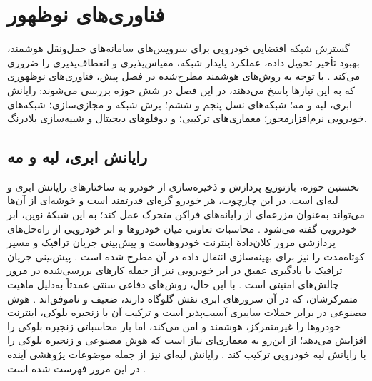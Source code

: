 \section{فناوری‌های نوظهور}
گسترش شبکه اقتضایی خودرویی برای سرویس‌های سامانه‌های حمل‌ونقل هوشمند، بهبود تأخیر تحویل داده، عملکرد پایدار شبکه، مقیاس‌پذیری و انعطاف‌پذیری را ضروری می‌کند \cite{hozouriOverviewVANETVehicular2023}. با توجه به روش‌های هوشمند مطرح‌شده در فصل پیش، فناوری‌های نوظهوری که به این نیازها پاسخ می‌دهند، در این فصل در شش حوزه بررسی می‌شوند: رایانش ابری، لبه و مه؛ شبکه‌های نسل پنجم و ششم؛ برش شبکه و مجازی‌سازی؛ شبکه‌های خودرویی نرم‌افزارمحور؛ معماری‌های ترکیبی؛ و دوقلوهای دیجیتال و شبیه‌سازی بلادرنگ.

\subsection{رایانش ابری، لبه و مه}
نخستین حوزه، بازتوزیع پردازش و ذخیره‌سازی از خودرو به ساختارهای رایانش ابری و لبه‌ای است. در این چارچوب، هر خودرو گره‌ای قدرتمند است و خوشه‌ای از آن‌ها می‌تواند به‌عنوان مزرعه‌ای از رایانه‌های فرا‌کن متحرک عمل کند؛ به این شبکهٔ نوین، ابر خودرویی گفته می‌شود \cite{hozouriOverviewVANETVehicular2023}. محاسبات تعاونی میان خودروها و ابر خودرویی از راه‌حل‌های پردازشی مرور کلان‌دادهٔ اینترنت خودروهاست و پیش‌بینی جریان ترافیک و مسیر کوتاه‌مدت را نیز برای بهینه‌سازی انتقال داده در آن مطرح شده است \cite{xuInternetVehiclesBig2018}. پیش‌بینی جریان ترافیک با یادگیری عمیق در ابر خودرویی نیز از جمله کارهای بررسی‌شده در مرور چالش‌های امنیتی است \cite{farsimadanReviewSecurityChallenges2025}. با این حال، روش‌های دفاعی سنتی عمدتاً به‌دلیل ماهیت متمرکزشان، که در آن سرورهای ابری نقش گلوگاه دارند، ضعیف و ناموفق‌اند \cite{farsimadanReviewSecurityChallenges2025}. هوش مصنوعی در برابر حملات سایبری آسیب‌پذیر است و ترکیب آن با زنجیره بلوکی، اینترنت خودروها را غیرمتمرکز، هوشمند و امن می‌کند، اما بار محاسباتی زنجیره بلوکی را افزایش می‌دهد؛ از این‌رو به معماری‌ای نیاز است که هوش مصنوعی و زنجیره بلوکی را با رایانش لبه خودرویی ترکیب کند \cite{hozouriOverviewVANETVehicular2023}. رایانش لبه‌ای  نیز از جمله موضوعات پژوهشی آینده در این مرور فهرست شده است \cite{hozouriOverviewVANETVehicular2023}.

